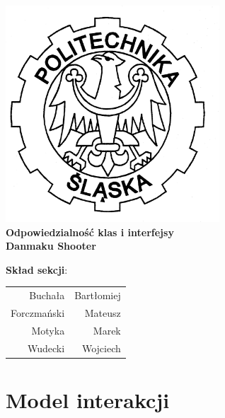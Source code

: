 \documentclass[a4paper,twoside]{article}
\begin{document}
\begin{titlepage}
	\centering
	\includegraphics[width=0.6\textwidth]{./images/logo.png}
	\\\vspace{10mm}
	\textbf{{\huge Odpowiedzialność klas i interfejsy}}\\\vspace{5mm}
	\textbf{{\Huge Danmaku Shooter}}
	\\
	\vfill
	\begin{flushright}
			{\Large \textbf{Skład sekcji}:}\\
		\begin{tabular}{rr}
			{\Large Buchała} & {\Large Bartłomiej}\\[-3pt]
			{\Large Forczmański} & {\Large Mateusz}\\[-3pt]
			{\Large Motyka} & {\Large Marek}\\[-3pt]
			{\Large Wudecki} & {\Large Wojciech}
		\end{tabular}
	\end{flushright}
	
\end{titlepage}

\part{\huge \textbf{Model interakcji}}
\end{document}

